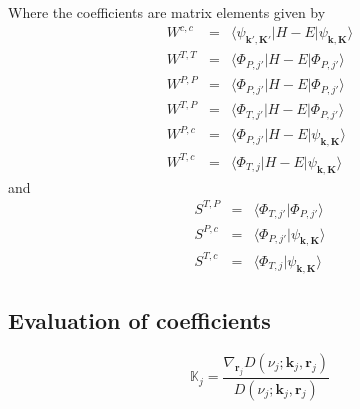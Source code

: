 \noindent Where the coefficients are matrix elements given by
\begin{eqnarray}
W^{c,c} &=& \langle
\psi_{\mathbf{k}',\mathbf{K}'}|H-E|\psi_{\mathbf{k},\mathbf{K}} \rangle
 \\
W^{T,T} &=& \langle \Phi_{P,j'}|H-E|\Phi_{P,j'} \rangle
 \\
W^{P,P} &=& \langle \Phi_{P,j'}|H-E|\Phi_{P,j'} \rangle
 \\
W^{T,P} &=& \langle \Phi_{T,j'}|H-E|\Phi_{P,j'} \rangle
 \\
W^{P,c} &=& \langle \Phi_{P,j'}|H-E|\psi_{\mathbf{k},\mathbf{K}}
\rangle
 \\
W^{T,c} &=& \langle \Phi_{T,j}|H-E|\psi_{\mathbf{k},\mathbf{K}} \rangle
 \end{eqnarray}
%
and
%
\begin{eqnarray}
S^{T,P} &=& \langle \Phi_{T,j'}|\Phi_{P,j'} \rangle
 \\
S^{P,c} &=& \langle \Phi_{P,j'}|\psi_{\mathbf{k},\mathbf{K}} \rangle
 \\
S^{T,c} &=& \langle \Phi_{T,j}|\psi_{\mathbf{k},\mathbf{K}} \rangle
\end{eqnarray}

\subsection{Evaluation of coefficients}
\[
\mathbb{K}_{j} = \frac{\nabla_{\mathbf{r}_{j}}
D(\nu_{j};\mathbf{k}_{j},\mathbf{r}_{j})}{D(\nu_{j};\mathbf{k}_{j},\mathbf{r}_{j})}
\]
% 
